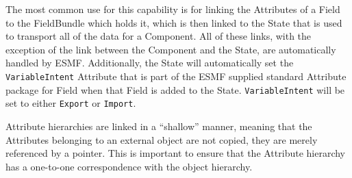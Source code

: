 The most common use for this capability is for linking the Attributes of a Field to the FieldBundle which holds it, which is then linked to the State that is used to transport all of the data for a Component.  All of these links, with the exception of the link between the Component and the State, are automatically handled by ESMF. Additionally, the State will automatically set the {\tt VariableIntent} Attribute that is part of the ESMF supplied standard Attribute package for Field when that Field is added to the State.  {\tt VariableIntent} will be set to either {\tt Export} or {\tt Import}.

Attribute hierarchies are linked in a ``shallow'' manner, meaning that the Attributes belonging to an external object are not copied, they are merely referenced by a pointer.  This is important to ensure that the Attribute hierarchy has a one-to-one correspondence with the object hierarchy.  
